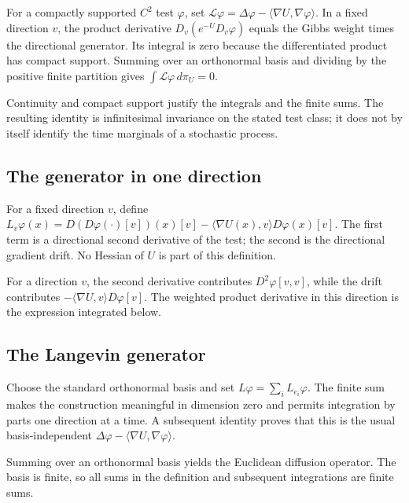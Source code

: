 \documentclass[11pt,a4paper]{article}
\begin{document}
For a compactly supported \(C^2\) test \(\varphi\), set \(\mathcal L\varphi=\Delta\varphi-\langle\nabla U,\nabla\varphi\rangle\). In a fixed direction \(v\), the product derivative \(D_v(e^{-U}D_v\varphi)\) equals the Gibbs weight times the directional generator. Its integral is zero because the differentiated product has compact support. Summing over an orthonormal basis and dividing by the positive finite partition gives \(\int\mathcal L\varphi\,d\pi_U=0\).



Continuity and compact support justify the integrals and the finite sums. The resulting identity is infinitesimal invariance on the stated test class; it does not by itself identify the time marginals of a stochastic process.


\subsection{\texorpdfstring{The generator in one direction}{The generator in one direction}}


For a fixed direction \(v\), define \(L_v\varphi(x)=D(D\varphi(\cdot)[v])(x)[v]-\langle\nabla U(x),v\rangle D\varphi(x)[v]\). The first term is a directional second derivative of the test; the second is the directional gradient drift. No Hessian of \(U\) is part of this definition.



For a direction \(v\), the second derivative contributes \(D^2\varphi[v,v]\), while the drift contributes \(-\langle\nabla U,v\rangle D\varphi[v]\). The weighted product derivative in this direction is the expression integrated below.


\subsection{\texorpdfstring{The Langevin generator}{The Langevin generator}}


Choose the standard orthonormal basis and set \(L\varphi=\sum_iL_{e_i}\varphi\). The finite sum makes the construction meaningful in dimension zero and permits integration by parts one direction at a time. A subsequent identity proves that this is the usual basis-independent \(\Delta\varphi-\langle\nabla U,\nabla\varphi\rangle\).



Summing over an orthonormal basis yields the Euclidean diffusion operator. The basis is finite, so all sums in the definition and subsequent integrations are finite sums.
\end{document}
